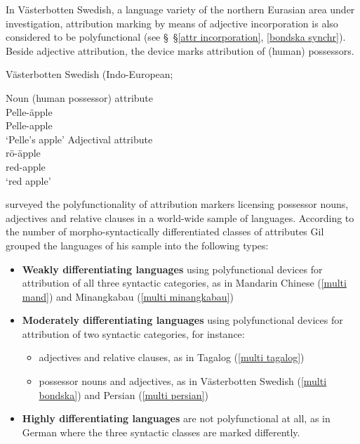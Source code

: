 In Västerbotten Swedish, a language variety of the northern Eurasian area under investigation, attribution marking by means of adjective incorporation is also considered to be polyfunctional (see \S~\S\ref{attr incorporation}, \ref{bondska synchr}). Beside adjective attribution, the device marks attribution of (human) possessors.
\begin{exe}
\ex 
\label{multi bondska}
\rm{Västerbotten Swedish (Indo-European; \citealt[examples from][5]{gil2005}}
\begin{xlist}
\ex \rm{Noun (human possessor) attribute}\\
\gll	Pelle-äpple\\
	Pelle-apple\\
\glt	‘Pelle's apple’
\ex \rm{Adjectival attribute}\\
\gll	rö-äpple\\
	red-apple\\
\glt	‘red apple’
\end{xlist}
\end{exe}
\cite{gil2005} surveyed the polyfunctionality of attribution markers licensing possessor nouns, adjectives and relative clauses in a world-wide sample of languages. According to the number of morpho-syntactically differentiated classes of attributes Gil grouped the languages of his sample into the following types:
\begin{itemize}
\item \textbf{Weakly differentiating languages} using polyfunctional devices for attribution of all three syntactic categories, as in Mandarin Chinese (\ref{multi mand}) and Minangkabau (\ref{multi minangkabau})
\item \textbf{Moderately differentiating languages} using polyfunctional devices for attribution of two syntactic categories, for instance:
	\begin{itemize}
	\item adjectives and relative clauses, as in Tagalog (\ref{multi tagalog})
	\item possessor nouns and adjectives, as in Västerbotten Swedish (\ref{multi bondska}) and Persian (\ref{multi persian})
	\end{itemize}
\item \textbf{Highly differentiating languages} are not polyfunctional at all, as in German where the three syntactic classes are marked differently.
\end{itemize}
